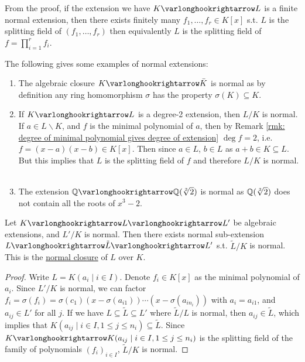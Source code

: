\begin{remark}
    From the proof, if the extension we have $K \ext L$ is a finite normal extension, then there exists finitely many $f_1, \dots, f_r \in K[x]$ s.t. $L$ is the splitting field of $(f_1, \dots, f_r)$ then equivalently $L$ is the splitting field of $f = \prod_{i = 1}^r f_i$.
\end{remark}

\begin{example}
    The following gives some examples of normal extensions:
    \begin{enumerate}
        \item The algebraic closure $K \ext \bar{K}$ is normal as by definition any ring homomorphism $\sigma$ has the property $\sigma(K) \subseteq K$.
        \item If $K \ext L$ is a degree-2 extension, then $L/K$ is normal. If $a \in L \smallsetminus K$, and $f$ is the minimal polynomial of $a$, then by Remark \ref{rmk: degree of minimal polynomial gives degree of extension} $\deg f = 2$, i.e. $f = (x-a)(x-b) \in K[x]$. Then since $a \in L$, $b \in L$ as $a + b \in K \subseteq L$. But this implies that $L$ is the splitting field of $f$ and therefore $L/K$ is normal. \
        \item The extension $\Q \ext \Q(\sqrt[3]{2})$ is normal as $\mathbb{Q}(\sqrt[3]{2})$ does not contain all the roots of $x^3 - 2$.
    \end{enumerate}
\end{example}

\begin{proposition}
    Let $K \ext L \ext L'$ be algebraic extensions, and $L'/K$ is normal. Then there exists normal sub-extension $L \ext \tilde{L} \ext L'$ s.t. $\tilde{L}/K$ is normal. This is the \underline{normal closure} of $L$ over $K$.
\end{proposition}

\begin{proof}
    Write $L = K(a_i \mid i \in I)$. Denote $f_i \in K[x]$ as the minimal polynomial of $a_i$. Since $L'/K$ is normal, we can factor $f_i = \sigma(f_i) = \sigma(c_1) (x - \sigma(a_{i1})) \cdots (x - \sigma(a_{i n_i}))$ with $a_i = a_{i1}$, and $a_{ij} \in L'$ for all $j$. If we have $L \subseteq \tilde{L} \subseteq L'$ where $\tilde{L}/L$ is normal, then $a_{ij} \in \tilde{L}$, which implies that $K(a_{ij} \mid i \in I, 1 \leq j \leq n_i) \subseteq \tilde{L}$. Since $K \ext K(a_{ij} \mid i \in I, 1 \leq j \leq n_i)$ is the splitting field of the family of polynomials $(f_i)_{i \in I}$, $\tilde{L}/K$ is normal.
\end{proof}

